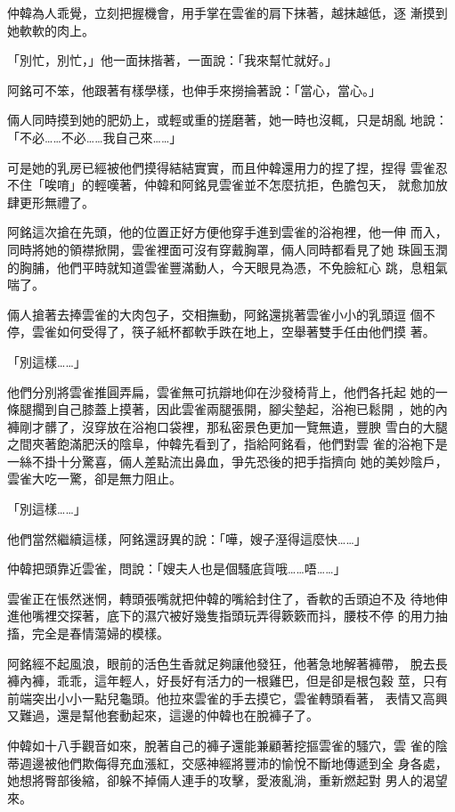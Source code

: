 仲韓為人乖覺，立刻把握機會，用手掌在雲雀的肩下抹著，越抹越低，逐
漸摸到她軟軟的肉上。

「別忙，別忙，」他一面抹揩著，一面說：「我來幫忙就好。」

阿銘可不笨，他跟著有樣學樣，也伸手來撈掄著說：「當心，當心。」

倆人同時摸到她的肥奶上，或輕或重的搓磨著，她一時也沒輒，只是胡亂
地說：「不必……不必……我自己來……」

可是她的乳房已經被他們摸得結結實實，而且仲韓還用力的捏了捏，捏得
雲雀忍不住「唉唷」的輕嘆著，仲韓和阿銘見雲雀並不怎麼抗拒，色膽包天，
就愈加放肆更形無禮了。

阿銘這次搶在先頭，他的位置正好方便他穿手進到雲雀的浴袍裡，他一伸
而入，同時將她的領襟掀開，雲雀裡面可沒有穿戴胸罩，倆人同時都看見了她
珠圓玉潤的胸脯，他們平時就知道雲雀豐滿動人，今天眼見為憑，不免臉紅心
跳，息粗氣喘了。

倆人搶著去捧雲雀的大肉包子，交相撫動，阿銘還挑著雲雀小小的乳頭逗
個不停，雲雀如何受得了，筷子紙杯都軟手跌在地上，空舉著雙手任由他們摸
著。

「別這樣……」

他們分別將雲雀推圓弄扁，雲雀無可抗辯地仰在沙發椅背上，他們各托起
她的一條腿擱到自己膝蓋上摸著，因此雲雀兩腿張開，腳尖墊起，浴袍已鬆開
，她的內褲剛才髒了，沒穿放在浴袍口袋裡，那私密景色更加一覽無遺，豐腴
雪白的大腿之間夾著飽滿肥沃的陰阜，仲韓先看到了，指給阿銘看，他們對雲
雀的浴袍下是一絲不掛十分驚喜，倆人差點流出鼻血，爭先恐後的把手指擠向
她的美妙陰戶，雲雀大吃一驚，卻是無力阻止。

「別這樣……」

他們當然繼續這樣，阿銘還訝異的說：「嘩，嫂子溼得這麼快……」

仲韓把頭靠近雲雀，問說：「嫂夫人也是個騷底貨哦……唔……」

雲雀正在悵然迷惘，轉頭張嘴就把仲韓的嘴給封住了，香軟的舌頭迫不及
待地伸進他嘴裡交探著，底下的濕穴被好幾隻指頭玩弄得簌簌而抖，腰枝不停
的用力抽搐，完全是春情蕩婦的模樣。

阿銘經不起風浪，眼前的活色生香就足夠讓他發狂，他著急地解著褲帶，
脫去長褲內褲，乖乖，這年輕人，好長好有活力的一根雞巴，但是卻是根包穀
莖，只有前端突出小小一點兒龜頭。他拉來雲雀的手去摸它，雲雀轉頭看著，
表情又高興又難過，還是幫他套動起來，這邊的仲韓也在脫褲子了。

仲韓如十八手觀音如來，脫著自己的褲子還能兼顧著挖摳雲雀的騷穴，雲
雀的陰蒂週邊被他們欺侮得充血漲紅，交感神經將豐沛的愉悅不斷地傳遞到全
身各處，她想將臀部後縮，卻躲不掉倆人連手的攻擊，愛液亂淌，重新燃起對
男人的渴望來。

